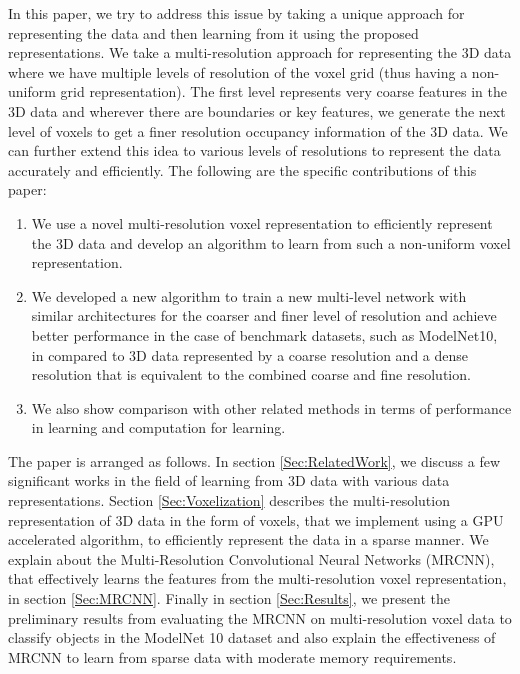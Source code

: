 \documentclass[10pt,letterpaper]{article}
\begin{document}
In this paper, we try to address this issue by taking a unique approach for representing the data and then learning from it using the proposed representations. We take a multi-resolution approach for representing the 3D data where we have multiple levels of resolution of the voxel grid (thus having a non-uniform grid representation). The first level represents very coarse features in the 3D data and wherever there are boundaries or key features, we generate the next level of voxels to get a finer resolution occupancy information of the 3D data. We can further extend this idea to various levels of resolutions to represent the data accurately and efficiently. The following are the specific contributions of this paper:

\begin{enumerate}
\setlength\itemsep{0.0em}
\item We use a novel multi-resolution voxel representation to efficiently represent the 3D data and develop an algorithm to learn from such a non-uniform voxel representation.
\item We developed a new algorithm to train a new multi-level network with similar architectures for the coarser and finer level of resolution and achieve better performance in the case of benchmark datasets, such as ModelNet10, in compared to 3D data represented by a coarse resolution and a dense resolution that is equivalent to the combined coarse and fine resolution.
\item We also show comparison with other related methods in terms of performance in learning and computation for learning.
\end{enumerate}

The paper is arranged as follows. In section \ref{Sec:RelatedWork}, we discuss a few significant works in the field of learning from 3D data with various data representations. Section \ref{Sec:Voxelization} describes the multi-resolution representation of 3D data in the form of voxels, that we implement using a GPU accelerated algorithm, to efficiently represent the data in a sparse manner. We explain about the Multi-Resolution Convolutional Neural Networks (MRCNN), that effectively learns the features from the multi-resolution voxel representation, in section \ref{Sec:MRCNN}. Finally in section \ref{Sec:Results}, we present the preliminary results from evaluating the MRCNN on multi-resolution voxel data to classify objects in the ModelNet 10 dataset and also explain the effectiveness of MRCNN to learn from sparse data with moderate memory requirements.
\end{document}
